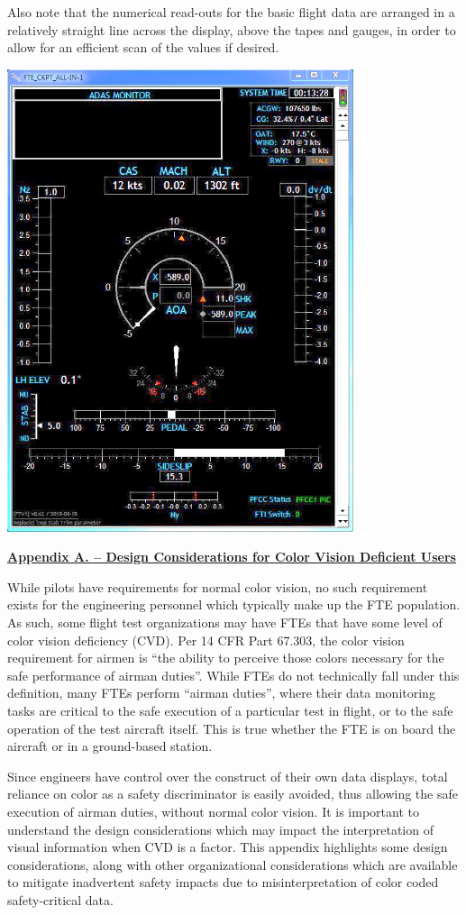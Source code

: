 \documentclass[
]{book}
\begin{document}
Also note that the numerical read-outs for the basic flight data are arranged in a relatively straight line across the display, above the tapes and gauges, in order to allow for an efficient scan of the values if desired.

\includegraphics[width=4.00486in,height=5.34236in]{media/21/image13.png}

\textbf{\underline{Appendix A. -- Design Considerations for Color Vision Deficient Users}}

While pilots have requirements for normal color vision, no such requirement exists for the engineering personnel which typically make up the FTE population. As such, some flight test organizations may have FTEs that have some level of color vision deficiency (CVD). Per 14 CFR Part 67.303, the color vision requirement for airmen is ``the ability to perceive those colors necessary for the safe performance of airman duties''. While FTEs do not technically fall under this definition, many FTEs perform ``airman duties'', where their data monitoring tasks are critical to the safe execution of a particular test in flight, or to the safe operation of the test aircraft itself. This is true whether the FTE is on board the aircraft or in a ground-based station.

Since engineers have control over the construct of their own data displays, total reliance on color as a safety discriminator is easily avoided, thus allowing the safe execution of airman duties, without normal color vision. It is important to understand the design considerations which may impact the interpretation of visual information when CVD is a factor. This appendix highlights some design considerations, along with other organizational considerations which are available to mitigate inadvertent safety impacts due to misinterpretation of color coded safety-critical data.
\end{document}
